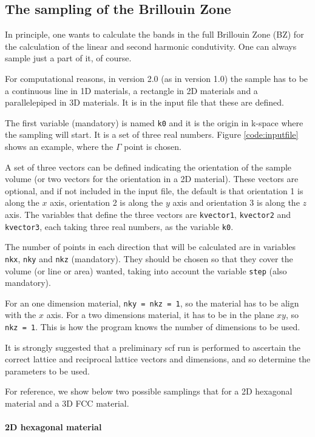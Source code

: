 \documentclass[a4paper,12pt]{report}
\begin{document}
 \subsection{The sampling of the Brillouin Zone}

 In principle, one wants to calculate the bands in the full Brillouin Zone (BZ)
 for the calculation of the linear and second harmonic condutivity.
 One can always sample just a part of it, of course.

 For computational reasons, in version 2.0 (as in version 1.0) the sample has to be
 a continuous line in 1D materials, a rectangle in 2D materials and a parallelepiped in 3D materials.
 It is in the input file that these are defined.

 The first variable (mandatory) is named \verb|k0| and it is the origin in k-space
 where the sampling will start.
 It is a set of three real numbers.
 Figure \ref{code:inputfile} shows an example, where the $\Gamma$ point is chosen.

 A set of three vectors can be defined indicating the orientation of the sample volume
 (or two vectors for the orientation in a 2D material).
 These vectors are optional, and if not included in the input file,
 the default is that orientation 1 is along the $x$ axis, orientation 2 is along the $y$
 axis and orientation 3 is along the $z$ axis.
 The variables that define the three vectors are \verb|kvector1|, \verb|kvector2| and \verb|kvector3|,
 each taking three real numbers, as the variable \verb|k0|.

 The number of points in each direction that will be calculated are in variables
 \verb|nkx|, \verb|nky| and \verb|nkz| (mandatory).
 They should be chosen so that they cover the volume (or line or area) wanted,
 taking into account the variable \verb|step| (also mandatory).

 For an one dimension material, \verb|nky = nkz = 1|, so the material has to be align with the $x$ axis.
 For a two dimensions material, it has to be in the plane $xy$, so \verb|nkz = 1|.
 This is how the program knows the number of dimensions to be used.

 It is strongly suggested that a preliminary scf run is performed to ascertain the correct
 lattice and reciprocal lattice vectors and dimensions,
 and so determine the parameters to be used.

 For reference, we show below two possible samplings that for a 2D hexagonal material
 and a 3D FCC material.

 \paragraph{2D hexagonal material}
\end{document}
